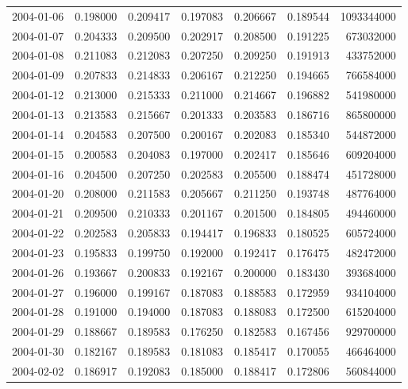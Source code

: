 \begin{tabular}{lrrrrrr}
2004-01-06 &    0.198000 &    0.209417 &    0.197083 &    0.206667 &    0.189544 &  1093344000 \\
2004-01-07 &    0.204333 &    0.209500 &    0.202917 &    0.208500 &    0.191225 &   673032000 \\
2004-01-08 &    0.211083 &    0.212083 &    0.207250 &    0.209250 &    0.191913 &   433752000 \\
2004-01-09 &    0.207833 &    0.214833 &    0.206167 &    0.212250 &    0.194665 &   766584000 \\
2004-01-12 &    0.213000 &    0.215333 &    0.211000 &    0.214667 &    0.196882 &   541980000 \\
2004-01-13 &    0.213583 &    0.215667 &    0.201333 &    0.203583 &    0.186716 &   865800000 \\
2004-01-14 &    0.204583 &    0.207500 &    0.200167 &    0.202083 &    0.185340 &   544872000 \\
2004-01-15 &    0.200583 &    0.204083 &    0.197000 &    0.202417 &    0.185646 &   609204000 \\
2004-01-16 &    0.204500 &    0.207250 &    0.202583 &    0.205500 &    0.188474 &   451728000 \\
2004-01-20 &    0.208000 &    0.211583 &    0.205667 &    0.211250 &    0.193748 &   487764000 \\
2004-01-21 &    0.209500 &    0.210333 &    0.201167 &    0.201500 &    0.184805 &   494460000 \\
2004-01-22 &    0.202583 &    0.205833 &    0.194417 &    0.196833 &    0.180525 &   605724000 \\
2004-01-23 &    0.195833 &    0.199750 &    0.192000 &    0.192417 &    0.176475 &   482472000 \\
2004-01-26 &    0.193667 &    0.200833 &    0.192167 &    0.200000 &    0.183430 &   393684000 \\
2004-01-27 &    0.196000 &    0.199167 &    0.187083 &    0.188583 &    0.172959 &   934104000 \\
2004-01-28 &    0.191000 &    0.194000 &    0.187083 &    0.188083 &    0.172500 &   615204000 \\
2004-01-29 &    0.188667 &    0.189583 &    0.176250 &    0.182583 &    0.167456 &   929700000 \\
2004-01-30 &    0.182167 &    0.189583 &    0.181083 &    0.185417 &    0.170055 &   466464000 \\
2004-02-02 &    0.186917 &    0.192083 &    0.185000 &    0.188417 &    0.172806 &   560844000 \\

\end{tabular}
